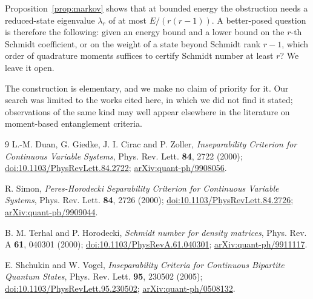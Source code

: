 \documentclass[11pt,a4paper]{article}
\theoremstyle{definition}
\theoremstyle{plain}
\begin{document}
Proposition~\ref{prop:markov} shows that at bounded energy the obstruction
needs a reduced-state eigenvalue $\lambda_r$ of at most $E/(r(r-1))$. A better-posed question
is therefore the following: given an energy bound and a lower bound on the
$r$-th Schmidt coefficient, or on the weight of a state beyond Schmidt rank
$r-1$, which order of quadrature moments suffices to certify Schmidt number at
least $r$? We leave it open.

The construction is elementary, and we make no claim of priority for it. Our
search was limited to the works cited here, in which we did not find it
stated; observations of the same kind may well appear elsewhere in the
literature on moment-based entanglement criteria.

\begingroup\small
\begin{thebibliography}{9}
\setlength{\itemsep}{2pt}
L.-M. Duan, G. Giedke, J. I. Cirac and P. Zoller,
\emph{Inseparability Criterion for Continuous Variable Systems},
Phys. Rev. Lett. \textbf{84}, 2722 (2000);
\href{https://doi.org/10.1103/PhysRevLett.84.2722}{doi:10.1103/PhysRevLett.84.2722};
\href{https://arxiv.org/abs/quant-ph/9908056}{arXiv:quant-ph/9908056}.

R. Simon,
\emph{Peres-Horodecki Separability Criterion for Continuous Variable Systems},
Phys. Rev. Lett. \textbf{84}, 2726 (2000);
\href{https://doi.org/10.1103/PhysRevLett.84.2726}{doi:10.1103/PhysRevLett.84.2726};
\href{https://arxiv.org/abs/quant-ph/9909044}{arXiv:quant-ph/9909044}.

B. M. Terhal and P. Horodecki,
\emph{Schmidt number for density matrices},
Phys. Rev. A \textbf{61}, 040301 (2000);
\href{https://doi.org/10.1103/PhysRevA.61.040301}{doi:10.1103/PhysRevA.61.040301};
\href{https://arxiv.org/abs/quant-ph/9911117}{arXiv:quant-ph/9911117}.

E. Shchukin and W. Vogel,
\emph{Inseparability Criteria for Continuous Bipartite Quantum States},
Phys. Rev. Lett. \textbf{95}, 230502 (2005);
\href{https://doi.org/10.1103/PhysRevLett.95.230502}{doi:10.1103/PhysRevLett.95.230502};
\href{https://arxiv.org/abs/quant-ph/0508132}{arXiv:quant-ph/0508132}.

\end{thebibliography}
\endgroup
\end{document}

